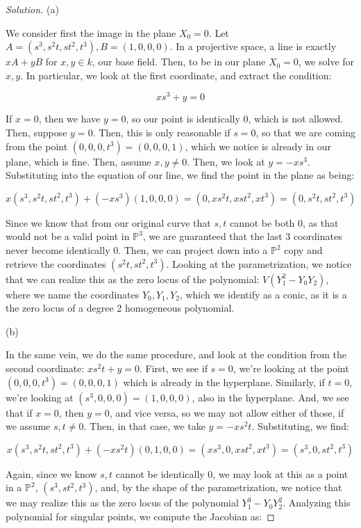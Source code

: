\documentclass[10pt]{article}
\begin{document}
\begin{proof}[Solution]

(a) 

We consider first the image in the plane $X_0 = 0$. Let $A = (s^3, s^2t, st^2, t^3), B = (1,0,0,0)$. In a projective space, a line is exactly $xA + yB$ for $x,y \in k$, our base field. Then, to be in our plane $X_0 = 0$, we solve for $x,y$. In particular, we look at the first coordinate, and extract the condition:

$$ xs^3 + y = 0 $$

If $x = 0$, then we have $y = 0$, so our point is identically $0$, which is not allowed. Then, suppose $y = 0$. Then, this is only reasonable if $s = 0$, so that we are coming from the point $(0,0,0,t^3) = (0,0,0,1)$, which we notice is already in our plane, which is fine. Then, assume $x,y \not = 0$. Then, we look at $y = -xs^3$. Substituting into the equation of our line, we find the point in the plane as being:

$$ x(s^3, s^2t, st^2, t^3) + (-xs^3)(1,0,0,0) = (0,xs^2t, xst^2, xt^3) = (0,s^2t,st^2, t^3) $$

Since we know that from our original curve that $s,t$ cannot be both $0$, as that would not be a valid point in $\mathbb{P}^3$, we are guaranteed that the last 3 coordinates never become identically $0$. Then, we can project down into a $\mathbb{P}^2$ copy and retrieve the coordinates $(s^2t, st^2, t^3)$. Looking at the parametrization, we notice that we can realize this as the zero locus of the polynomial: $V(Y_1^2 - Y_0 Y_2)$, where we name the coordinates $Y_0,Y_1,Y_2$, which we identify as a conic, as it is a the zero locus of a degree 2 homogeneous polynomial.

(b)

In the same vein, we do the same procedure, and look at the condition from the second coordinate: $xs^2t + y = 0$. First, we see if $s = 0$, we're looking at the point $(0,0,0,t^3) = (0,0,0,1)$ which is already in the hyperplane. Similarly, if $t = 0$, we're looking at $(s^3,0,0,0) = (1,0,0,0)$, also in the hyperplane. And, we see that if $x = 0$, then $y = 0$, and vice versa, so we may not allow either of those, if we assume $s,t \not = 0$. Then, in that case, we take $y = -xs^2t$. Substituting, we find:

$$ x(s^3, s^2t, st^2, t^3) + (-xs^2t)(0,1,0,0) = (xs^3,0, xst^2, xt^3) = (s^3,0,st^2, t^3) $$

Again, since we know $s,t$ cannot be identically 0, we may look at this as a point in a $\mathbb{P}^2$, $(s^3, st^2, t^3)$, and, by the shape of the parametrization, we notice that we may realize this as the zero locus of the polynomial $Y_1^3 - Y_0 Y_2^2$. Analyzing this polynomial for singular points, we compute the Jacobian as:


\end{proof}
\end{document}
